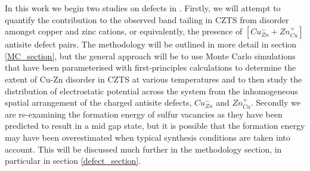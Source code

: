 In this work we begin two studies on defects in {\CZTS}. Firstly, we will attempt to quantify the contribution to the observed band tailing in CZTS from disorder amongst copper and zinc cations, or equivalently, the presence of $[Cu_{Zn}^{-} + Zn_{Cu}^{+}]$ antisite defect pairs. The methodology will be outlined in more detail in section \ref{MC_section}, but the general approach will be to use Monte Carlo simulations that have been parameterised with first-principles calculations to determine the extent of Cu-Zn disorder in CZTS at various temperatures and to then study the distribution of electrostatic potential across the system from the inhomogeneous spatial arrangement of the charged antisite defects,  $Cu_{Zn}^-$ and $Zn_{Cu}^+$.
Secondly we are re-examining the formation energy of sulfur vacancies as they have been predicted \cite{defect1} to result in a mid gap state, but it is possible that the formation energy may have been overestimated when typical synthesis conditions are taken into account. This will be discussed much further in the methodology section, in particular in section \ref{defect_section}.














